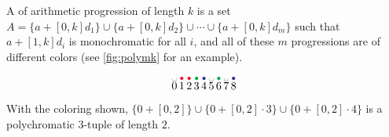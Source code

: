 A   of arithmetic progression of length $k$ is a set $A = \{a + [0,k]d_1\} \cup \{ a + [0,k]d_2\} \cup \dotsm \cup \{a + [0,k]d_m\}$ such that $a+ [1,k]d_i$ is monochromatic for all $i$, and all of these $m$ progressions are of different colors (see \cref{fig:polymk} for an example).

\begin{marginfigure}
\[
 \stackrel{\text{\textvisiblespace}}{0}\,\stackrel{\rdotm}{1}\,\stackrel{\rdotm}{2}\,\stackrel{\gdotm}{3}\,\stackrel{\bdotm}{4}\,\stackrel{\text{\textvisiblespace}}{5} \,\stackrel{\gdotm}{6}\,\stackrel{\text{\textvisiblespace}}{7}\,\stackrel{\bdotm}{8}
\]
\caption{With the coloring shown, $\{ 0 + [0,2]\} \cup \{0 + [0,2]\cdot 3\} \cup \{0 + [0,2]\cdot 4\}$ is a  polychromatic $3$-tuple of length $2$.}\label{fig:polymk}
\end{marginfigure}


